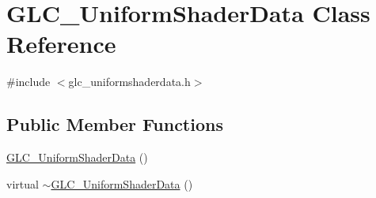 \hypertarget{class_g_l_c___uniform_shader_data}{\section{G\-L\-C\-\_\-\-Uniform\-Shader\-Data Class Reference}
\label{class_g_l_c___uniform_shader_data}
}


{\ttfamily \#include $<$glc\-\_\-uniformshaderdata.\-h$>$}

\subsection*{Public Member Functions}
\begin{DoxyCompactItemize}
\item 
\hyperlink{class_g_l_c___uniform_shader_data_addfece6c04f35653ba5a16cad6762d96}{G\-L\-C\-\_\-\-Uniform\-Shader\-Data} ()
\item 
virtual \hyperlink{class_g_l_c___uniform_shader_data_aecf19d88cf2772d20377a0b93a202a60}{$\sim$\-G\-L\-C\-\_\-\-Uniform\-Shader\-Data} ()
\end{DoxyCompactItemize}
